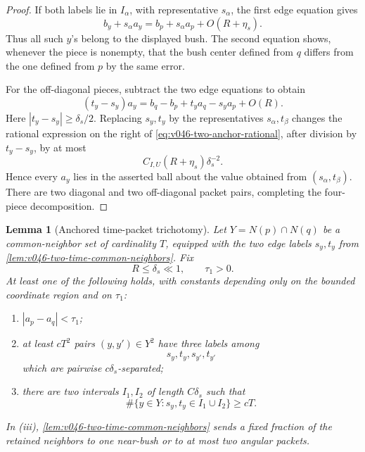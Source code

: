 \documentclass[10pt]{article}
\newtheorem{lemma}[theorem]{Lemma}
\begin{document}
\begin{proof}
If both labels lie in \(I_\alpha\), with representative \(s_\alpha\), the first edge equation gives
\[
b_y+s_\alpha a_y
=
b_p+s_\alpha a_p+O(R+\eta_s).
\]
Thus all such \(y\)'s belong to the displayed bush.  The second equation shows, whenever the piece
is nonempty, that the bush center defined from \(q\) differs from the one defined from \(p\) by the
same error.

For the off-diagonal pieces, subtract the two edge equations to obtain
\begin{equation}
\label{eq:v046-two-anchor-rational}
(t_y-s_y)a_y
=
b_q-b_p+t_ya_q-s_ya_p+O(R).
\end{equation}
Here \(|t_y-s_y|\ge\delta_s/2\).  Replacing \(s_y,t_y\) by the representatives
\(s_\alpha,t_\beta\) changes the rational expression on the right of
\eqref{eq:v046-two-anchor-rational}, after division by \(t_y-s_y\), by at most
\[
C_{I,U}(R+\eta_s)\delta_s^{-2}.
\]
Hence every \(a_y\) lies in the asserted ball about the value obtained from
\((s_\alpha,t_\beta)\).  There are two diagonal and two off-diagonal packet pairs, completing the
four-piece decomposition.
\end{proof}

\begin{lemma}[Anchored time-packet trichotomy]
\label{lem:v046-anchored-time-packet-trichotomy}
Let \(Y=N(p)\cap N(q)\) be a common-neighbor set of cardinality \(T\), equipped with the two edge
labels \(s_y,t_y\) from \cref{lem:v046-two-time-common-neighbors}.  Fix
\[
R\le\delta_s\ll1,
\qquad
\tau_1>0.
\]
At least one of the following holds, with constants depending only on the bounded coordinate
region and on \(\tau_1\):
\begin{enumerate}[label=\textnormal{(\roman*)}]
\item \(|a_p-a_q|<\tau_1\);
\item at least \(cT^2\) pairs \((y,y')\in Y^2\) have three labels among
\[
s_y,t_y,s_{y'},t_{y'}
\]
which are pairwise \(c\delta_s\)-separated;
\item there are two intervals \(I_1,I_2\) of length \(C\delta_s\) such that
\[
\#\{y\in Y:s_y,t_y\in I_1\cup I_2\}
\ge cT.
\]
\end{enumerate}
In (iii), \cref{lem:v046-two-time-common-neighbors} sends a fixed fraction of the retained
neighbors to one near-bush or to at most two angular packets.
\end{lemma}
\end{document}
